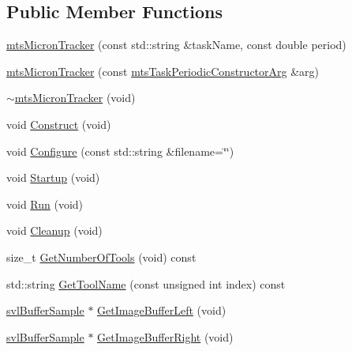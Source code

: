 \subsection*{Public Member Functions}
\begin{DoxyCompactItemize}
\item 
\hyperlink{classmts_micron_tracker_a0b790611b1fc0d4ed289aa8b8accb170}{mts\-Micron\-Tracker} (const std\-::string \&task\-Name, const double period)
\item 
\hyperlink{classmts_micron_tracker_a5fa387f0547c0da7016fdcd224c28766}{mts\-Micron\-Tracker} (const \hyperlink{classmts_task_periodic_constructor_arg}{mts\-Task\-Periodic\-Constructor\-Arg} \&arg)
\item 
\hyperlink{classmts_micron_tracker_acf5f550a10bc1e38682278f11daf840d}{$\sim$mts\-Micron\-Tracker} (void)
\item 
void \hyperlink{classmts_micron_tracker_a65561ad5a44077e94cbccc155686ef90}{Construct} (void)
\item 
void \hyperlink{classmts_micron_tracker_a10459ab3727e97aa19e74c95c151ee75}{Configure} (const std\-::string \&filename=\char`\"{}\char`\"{})
\item 
void \hyperlink{classmts_micron_tracker_aff4c78dc362a728ad6a44f0d2b9242aa}{Startup} (void)
\item 
void \hyperlink{classmts_micron_tracker_a6445add41169ec175e0aff27432c930d}{Run} (void)
\item 
void \hyperlink{classmts_micron_tracker_a1f62513238bb096abede1f9a87317275}{Cleanup} (void)
\item 
size\-\_\-t \hyperlink{classmts_micron_tracker_a86af64a44ae5a1cb9ad0981a67af73df}{Get\-Number\-Of\-Tools} (void) const 
\item 
std\-::string \hyperlink{classmts_micron_tracker_a58f8d0a2e2ddf0547b3c9f6d91481769}{Get\-Tool\-Name} (const unsigned int index) const 
\item 
\hyperlink{classsvl_buffer_sample}{svl\-Buffer\-Sample} $\ast$ \hyperlink{classmts_micron_tracker_a1b988bae0806ea0a8c44377e80d16bf4}{Get\-Image\-Buffer\-Left} (void)
\item 
\hyperlink{classsvl_buffer_sample}{svl\-Buffer\-Sample} $\ast$ \hyperlink{classmts_micron_tracker_a7d8f186eaf36a43326dc9954a1d7fd32}{Get\-Image\-Buffer\-Right} (void)
\end{DoxyCompactItemize}
